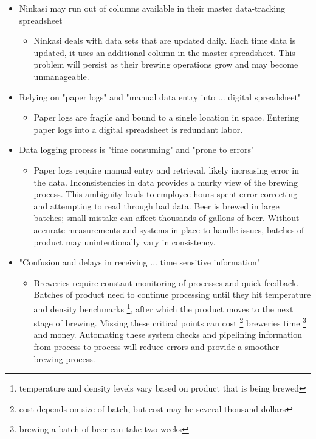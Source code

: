 \documentclass[draftclsnofoot,onecolumn,letterpaper,10pt]{IEEEtran}
\begin{document}
\begin{itemize}

    \item {Ninkasi may run out of columns available in their master data-tracking spreadsheet}
      \begin{itemize}
      \item {Ninkasi deals with data sets that are updated daily. Each time data is updated, it uses an additional column in the master spreadsheet. This problem will persist as their brewing operations grow and may become unmanageable.}
      	\end{itemize}

	\item {Relying on "paper logs" and "manual data entry into ... digital spreadsheet"}
	    \begin{itemize}
			\item {Paper logs are fragile and bound to a single location in space. Entering paper logs into a digital spreadsheet is redundant labor.}
      	    \end{itemize}

	\item {Data logging process is "time consuming" and "prone to errors"}
      		\begin{itemize}
			\item {Paper logs require manual entry and retrieval, likely increasing error in the data. Inconsistencies in data provides a murky view of the brewing process. This ambiguity leads to employee hours spent error correcting and attempting to read through bad data. Beer is brewed in large batches; small mistake can affect thousands of gallons of beer. Without accurate measurements and systems in place to handle issues, batches of product may unintentionally vary in consistency.}
      		\end{itemize}

	\item {"Confusion and delays in receiving ... time sensitive information"}
      		\begin{itemize}
			\item {Breweries require constant monitoring of processes and quick feedback. Batches of product need to continue processing until they hit temperature and density benchmarks \footnote{temperature and density levels vary based on product that is being brewed}, after which the product moves to the next stage of brewing. Missing these critical points can cost \footnote{cost depends on size of batch, but cost may be several thousand dollars} breweries time \footnote{brewing a batch of beer can take two weeks} and money. Automating these system checks and pipelining information from process to process will reduce errors and provide a smoother brewing process.
}
      		\end{itemize}


\end{itemize}
\end{document}
